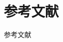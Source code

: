 \documentclass{ctexbeamer}
\begin{document}


\section{参考文献}
\begin{frame}{参考文献}
    \printbibliography
\end{frame}
\end{document}
